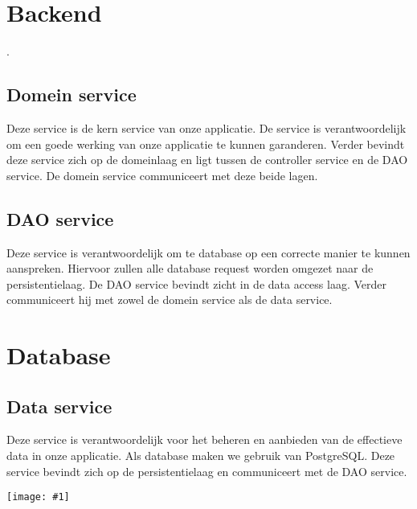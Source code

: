 \documentclass[11pt,openany]{article}
\newcommand{\diagram}[1]{
	\texttt{[image: \#1]}
}
\newcommand{\vertdiagram}[1]{
	\begin{sidewaysfigure}
		\diagram{#1}
	\end{sidewaysfigure}
}
\begin{document}
	\section{Backend}.
	\subsection{Domein service}
	Deze service is de kern service van onze applicatie. De service is verantwoordelijk om een goede werking van onze applicatie te kunnen garanderen. Verder bevindt deze service zich op de domeinlaag en ligt tussen de controller service en de DAO service. De domein service communiceert met deze beide lagen.
	\subsection{DAO service}
	Deze service is verantwoordelijk om te database op een correcte manier te kunnen aanspreken. Hiervoor zullen alle database request worden omgezet naar de persistentielaag. De DAO service bevindt zicht in de data access laag. Verder communiceert hij met zowel de domein service als de data service.
	\section{Database}
	\subsection{Data service}
	Deze service is verantwoordelijk voor het beheren en aanbieden van de effectieve data in onze applicatie. Als database maken we gebruik van PostgreSQL. Deze service bevindt zich op de persistentielaag en communiceert met de DAO service.
	
	\vertdiagram{ComponentModule}
\end{document}
